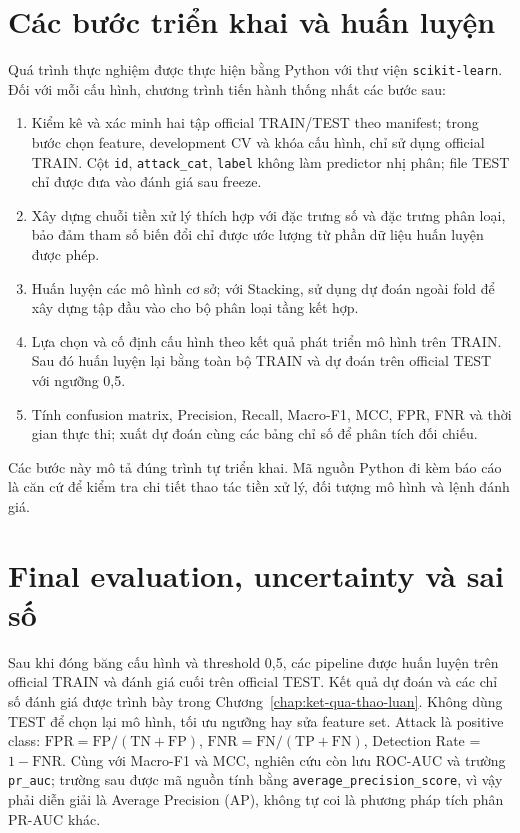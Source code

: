 \section{Các bước triển khai và huấn luyện}
Quá trình thực nghiệm được thực hiện bằng Python với thư viện \texttt{scikit-learn}. Đối với mỗi cấu hình, chương trình tiến hành thống nhất các bước sau:
\begin{enumerate}
\item Kiểm kê và xác minh hai tập official TRAIN/TEST theo manifest; trong bước chọn feature, development CV và khóa cấu hình, chỉ sử dụng official TRAIN. Cột \texttt{id}, \texttt{attack\_cat}, \texttt{label} không làm predictor nhị phân; file TEST chỉ được đưa vào đánh giá sau freeze.
\item Xây dựng chuỗi tiền xử lý thích hợp với đặc trưng số và đặc trưng phân loại, bảo đảm tham số biến đổi chỉ được ước lượng từ phần dữ liệu huấn luyện được phép.
\item Huấn luyện các mô hình cơ sở; với Stacking, sử dụng dự đoán ngoài fold để xây dựng tập đầu vào cho bộ phân loại tầng kết hợp.
\item Lựa chọn và cố định cấu hình theo kết quả phát triển mô hình trên TRAIN. Sau đó huấn luyện lại bằng toàn bộ TRAIN và dự đoán trên official TEST với ngưỡng 0,5.
\item Tính confusion matrix, Precision, Recall, Macro-F1, MCC, FPR, FNR và thời gian thực thi; xuất dự đoán cùng các bảng chỉ số để phân tích đối chiếu.
\end{enumerate}
Các bước này mô tả đúng trình tự triển khai. Mã nguồn Python đi kèm báo cáo là căn cứ để kiểm tra chi tiết thao tác tiền xử lý, đối tượng mô hình và lệnh đánh giá.

\section{Final evaluation, uncertainty và sai số}
Sau khi đóng băng cấu hình và threshold 0,5, các pipeline được huấn luyện trên official TRAIN và đánh giá cuối trên official TEST. Kết quả dự đoán và các chỉ số đánh giá được trình bày trong Chương~\ref{chap:ket-qua-thao-luan}. Không dùng TEST để chọn lại mô hình, tối ưu ngưỡng hay sửa feature set. Attack là positive class: $\mathrm{FPR}=\mathrm{FP}/(\mathrm{TN}+\mathrm{FP})$, $\mathrm{FNR}=\mathrm{FN}/(\mathrm{TP}+\mathrm{FN})$, Detection Rate = $1-\mathrm{FNR}$. Cùng với Macro-F1 và MCC, nghiên cứu còn lưu ROC-AUC và trường \texttt{pr\_auc}; trường sau được mã nguồn tính bằng \texttt{average\_precision\_score}, vì vậy phải diễn giải là Average Precision (AP), không tự coi là phương pháp tích phân PR-AUC khác.

